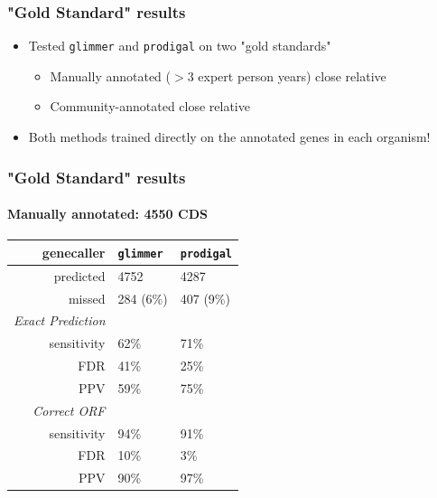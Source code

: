 \documentclass[table]{beamer}
\begin{document}
    \begin{frame}
     \frametitle{"Gold Standard" results}
     \begin{itemize}
       \item Tested \texttt{glimmer} and \texttt{prodigal} on two "gold standards"
       \begin{itemize}
         \item Manually annotated ($>$3 expert person years) close relative
         \item Community-annotated close relative
       \end{itemize}
       \item Both methods trained directly on the annotated genes in each organism!
     \end{itemize} 
   \end{frame} 

    \begin{frame}
     \frametitle{"Gold Standard" results}
     \framesubtitle{Manually annotated: 4550 CDS}
    \begin{center}
	\begin{tabular}{r|l|l}
	  genecaller & \texttt{glimmer} & \texttt{prodigal}  \\
	  \hline
	  predicted & 4752    & 4287  \\
	  missed & 284 (6\%)   & 407 (9\%)  \\
	  \hline
	  \emph{Exact Prediction} & & \\
  	  sensitivity   & 62\%   & 71\%  \\
  	  FDR   & 41\%   & 25\%  \\  
	  PPV   & 59\% & 75\%  \\  
	  \hline
	  \emph{Correct ORF} & & \\
  	  sensitivity   & 94\%   & 91\% \\
  	  FDR   & 10\%  & 3\% \\  
	  PPV   & 90\% & 97\%  \\  
	\end{tabular}
	\end{center}     
   \end{frame} 
\end{document}
